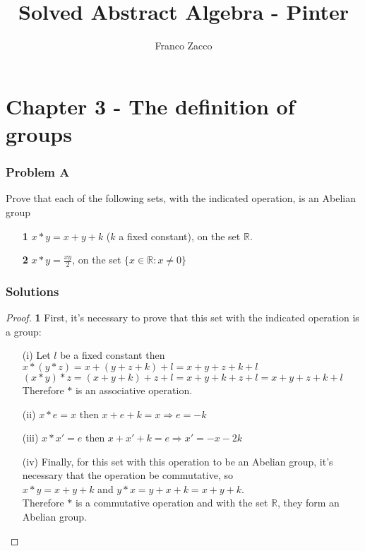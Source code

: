 \documentclass[11pt]{article}
\title{\textbf{Solved Abstract Algebra - Pinter}}
\author{Franco Zacco}
\date{}
\begin{document}
\maketitle
\thispagestyle{empty}

\section*{Chapter 3 - The definition of groups}

	\subsubsection*{Problem A}

		Prove that each of the following sets, with the indicated operation, is an Abelian group
		\begin{itemize}
			\item [\textbf{1}] $x * y = x+y+k$ ($k$ a fixed constant), on the set $\mathbb{R}$.
			\item [\textbf{2}] $x*y=\frac{xy}{2}$, on the set $\{ x \in \mathbb{R}: x \neq 0\}$
		\end{itemize}

	\subsubsection*{Solutions}

		\begin{proof}{\textbf{1}}
		First, it's necessary to prove that this set with the indicated operation is a group:
		\begin{itemize}
			\item [(i)] Let $l$ be a fixed constant then\\
			$x*(y*z)=x+(y+z+k)+l = x+y+z+k+l$ \\
			$(x*y)*z=(x+y+k)+z+l = x+y+k+z+l=x+y+z+k+l$ \\
			Therefore $*$ is an associative operation.
			\item [(ii)] $x*e=x$ then $x+e+k=x \Rightarrow e=-k$
			\item [(iii)] $x*x'=e$ then $x+x'+k=e \Rightarrow x'=-x-2k$
			\item [(iv)] Finally, for this set with this operation to be an Abelian group, it's necessary that the operation be commutative, so \\
			$x*y =x+y+k$ and $y*x=y+x+k=x+y+k$.\\
			Therefore $*$ is a commutative operation and with the set $\mathbb{R}$, they form an Abelian group.
		\end{itemize}
		\end{proof}
\end{document}
